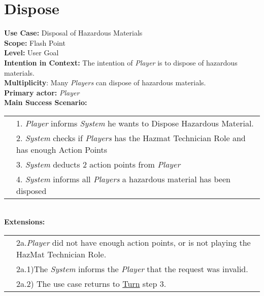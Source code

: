 \documentclass{article}
\begin{document}
	\section*{Dispose}
	\textbf{Use Case:} Disposal of Hazardous Materials\\
	\textbf{Scope:} Flash Point\\
	\textbf{Level:} User Goal\\
	\textbf{Intention in Context:} The intention of \textit{Player} is to dispose of hazardous materials.\\
	\textbf{Multiplicity}: Many \textit{Players} can dispose of hazardous materials.\\
	\textbf{Primary actor:} \textit{Player}\\
	\textbf{Main Success Scenario:}\\
	\begin{tabular}{l l}
		&1. \textit{Player} informs \textit{System} he wants to Dispose Hazardous Material.\\
		&2. \textit{System} checks if \textit{Players} has the Hazmat Technician Role and has enough Action Points\\
		&3. \textit{System} deducts 2 action points from \textit{Player}\\
		&4. \textit{System} informs all \textit{Players} a hazardous material has been disposed\\
		
	\end{tabular}\\
	\textbf{Extensions:}\\
	\begin{tabular}{l l}
		&2a.\textit{Player} did not have enough action points, or is not playing the HazMat Technician Role.\\
		&\qquad2a.1)The \textit{System} informs the \textit{Player} that the request was invalid.\\
		&\qquad2a.2) The use case returns to \underline{Turn} step 3.
	\end{tabular}
\end{document}
